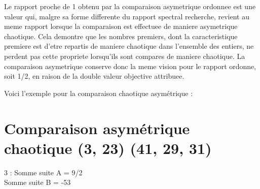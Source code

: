 \documentclass[a4paper,11pt]{article}
\begin{document}
Le rapport proche de 1 obtenu par la comparaison asymetrique ordonnee est une valeur qui, malgre sa forme 
differente du rapport spectral recherche, revient au meme rapport lorsque la comparaison est effectuee de 
maniere asymetrique chaotique. Cela demontre que les nombres premiers, dont la caracteristique premiere est 
d'etre repartis de maniere chaotique dans l'ensemble des entiers, ne perdent pas cette propriete lorsqu'ils 
sont compares de maniere chaotique. La comparaison asymetrique conserve donc la meme vision pour le rapport 
ordonne, soit 1/2, en raison de la double valeur objective attribuee.

Voici l'exemple pour la comparaison chaotique asymétrique :

\section*{Comparaison asymétrique chaotique (3, 23) (41, 29, 31)}

3 : Somme suite A = 9/2 \\
\hspace*{1.5em}Somme suite B = -53 \
\end{document}
